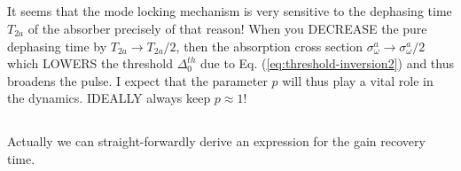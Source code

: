 \documentclass[preprint,secnumarabic,amssymb, nobibnotes, aip, prd]{revtex4-1}
\begin{document}
\subsection{}
	It seems that the mode locking mechanism is very sensitive to the dephasing time $T_{2a}$ of the absorber precisely of that reason! When you DECREASE the pure dephasing time by $T_{2a}\rightarrow T_{2a}/2$, then the absorption cross section $\sigma_\omega^{a} \rightarrow \sigma_\omega^{a}/2$ which LOWERS the threshold $\Delta_{0}^{th}$ due to Eq. (\ref{eq:threshold-inversion2}) and thus broadens the pulse. I expect that the parameter $p$ will thus play a vital role in the dynamics. IDEALLY always keep $p \approx 1$!  
\subsection{}
Actually we can straight-forwardly derive an expression for the gain recovery time. 
\end{document}
